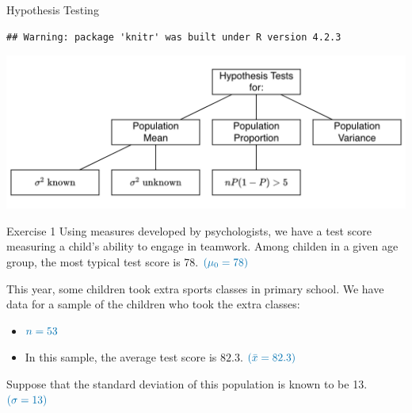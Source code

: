 \documentclass[
  11pt,
  ignorenonframetext,
]{beamer}
\begin{document}
\begin{frame}[fragile]{Hypothesis Testing}
\protect\hypertarget{hypothesis-testing}{}
\begin{verbatim}
## Warning: package 'knitr' was built under R version 4.2.3
\end{verbatim}

\begin{center}\includegraphics[width=0.9\linewidth]{../LAB3-2324/pictures/HypothesisTestObj} \end{center}
\end{frame}

\begin{frame}{Exercise 1}
\protect\hypertarget{exercise-1}{}
Using measures developed by psychologists, we have a test score
measuring a child's ability to engage in teamwork. Among childen in a
given age group, the most typical test score is 78.
\(\color{blue}{(\mu_0 = 78)}\)

This year, some children took extra sports classes in primary school. We
have data for a sample of the children who took the extra classes:

\begin{itemize}
\item
  \(\color{blue}{n=53}\)
\item
  In this sample, the average test score is \(82.3\).
  \(\color{blue}{(\bar{x} = 82.3)}\)
\end{itemize}

Suppose that the standard deviation of this population is known to be
13. \(\color{blue}{(\sigma = 13)}\)
\end{frame}
\end{document}
